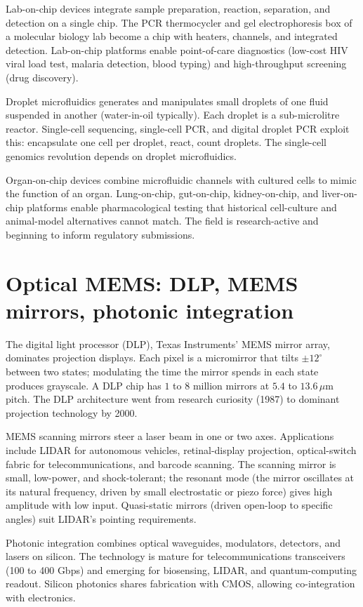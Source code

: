Lab-on-chip devices integrate sample preparation, reaction, separation, and detection on a single chip. The PCR thermocycler and gel electrophoresis box of a molecular biology lab become a chip with heaters, channels, and integrated detection. Lab-on-chip platforms enable point-of-care diagnostics (low-cost HIV viral load test, malaria detection, blood typing) and high-throughput screening (drug discovery).

Droplet microfluidics generates and manipulates small droplets of one fluid suspended in another (water-in-oil typically). Each droplet is a sub-microlitre reactor. Single-cell sequencing, single-cell PCR, and digital droplet PCR exploit this: encapsulate one cell per droplet, react, count droplets. The single-cell genomics revolution depends on droplet microfluidics.

Organ-on-chip devices combine microfluidic channels with cultured cells to mimic the function of an organ. Lung-on-chip, gut-on-chip, kidney-on-chip, and liver-on-chip platforms enable pharmacological testing that historical cell-culture and animal-model alternatives cannot match. The field is research-active and beginning to inform regulatory submissions.

\section{Optical MEMS: DLP, MEMS mirrors, photonic integration}

The digital light processor (DLP), Texas Instruments' MEMS mirror array, dominates projection displays. Each pixel is a micromirror that tilts $\pm 12^\circ$ between two states; modulating the time the mirror spends in each state produces grayscale. A DLP chip has $1$ to $8$ million mirrors at $5.4$ to $13.6\,\mu\text{m}$ pitch. The DLP architecture went from research curiosity (1987) to dominant projection technology by 2000.

MEMS scanning mirrors steer a laser beam in one or two axes. Applications include LIDAR for autonomous vehicles, retinal-display projection, optical-switch fabric for telecommunications, and barcode scanning. The scanning mirror is small, low-power, and shock-tolerant; the resonant mode (the mirror oscillates at its natural frequency, driven by small electrostatic or piezo force) gives high amplitude with low input. Quasi-static mirrors (driven open-loop to specific angles) suit LIDAR's pointing requirements.

Photonic integration combines optical waveguides, modulators, detectors, and lasers on silicon. The technology is mature for telecommunications transceivers (100 to 400 Gbps) and emerging for biosensing, LIDAR, and quantum-computing readout. Silicon photonics shares fabrication with CMOS, allowing co-integration with electronics.

